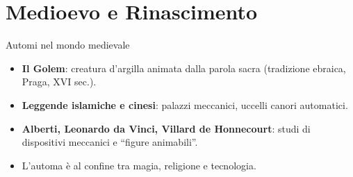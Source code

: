 \documentclass{beamer}
\begin{document}
\section{Medioevo e Rinascimento}
%
%
\begin{frame}{Automi nel mondo medievale}
  \begin{itemize}
    \item \textbf{Il Golem}: creatura d’argilla animata dalla parola sacra (tradizione ebraica, Praga, XVI sec.).
    \item \textbf{Leggende islamiche e cinesi}: palazzi meccanici, uccelli canori automatici.
    \item \textbf{Alberti, Leonardo da Vinci, Villard de Honnecourt}: studi di dispositivi meccanici e “figure animabili”.
    \item L’automa è al confine tra magia, religione e tecnologia.
  \end{itemize}
\end{frame}
%
\end{document}
